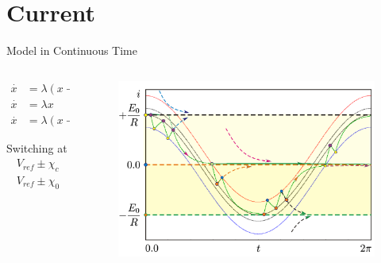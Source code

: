 \section{Current}

\begin{frame}{Model in Continuous Time}
	\vspace{-1em}
	\begin{columns}
		\begin{column}{.3 \textwidth}
			\begin{align*}
				\overset{\cdot}{x} & = \lambda (x - 1) \quad & \text{if } & K_{F} = +1 \\
				\overset{\cdot}{x} & = \lambda x       \quad & \text{if } & K_{F} = 0  \\
				\overset{\cdot}{x} & = \lambda (x + 1) \quad & \text{if } & K_{F} = -1
			\end{align*}

			Switching at
			\begin{align*}
				V_{ref} \pm \chi_{c} \\
				V_{ref} \pm \chi_{0}
			\end{align*}
		\end{column}
		\begin{column}{.7 \textwidth}
			\begin{figure}
				\includegraphics[width=0.7 \textwidth]{Figs/continuous_model.png}
			\end{figure}

			\flushright{[Zhusubaliyev]}
		\end{column}
	\end{columns}
\end{frame}

